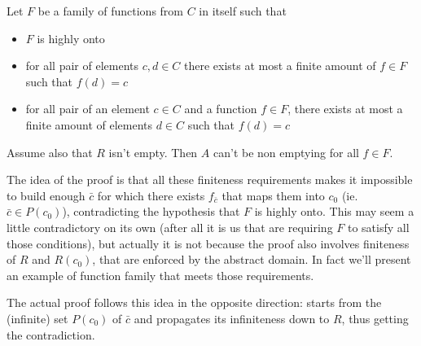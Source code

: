 \begin{theorem}\label{ch4:th:non-empt-res-global}
	Let $F$ be a family of functions from $C$ in itself such that
	\begin{itemize}
		\item $F$ is highly onto
		\item for all pair of elements $c, d \in C$ there exists at most a finite amount of $f \in F$ such that $f(d) = c$
		\item for all pair of an element $c \in C$ and a function $f \in F$, there exists at most a finite amount of elements $d \in C$ such that $f(d) = c$
	\end{itemize}
	Assume also that $R$ isn't empty. Then $A$ can't be non emptying for all $f \in F$.
\end{theorem}

The idea of the proof is that all these finiteness requirements makes it impossible to build enough $\bar{c}$ for which there exists $f_{\bar{c}}$ that maps them into $c_0$ (ie. $\bar{c} \in P(c_0)$), contradicting the hypothesis that $F$ is highly onto. This may seem a little contradictory on its own (after all it is us that are requiring $F$ to satisfy all those conditions), but actually it is not because the proof also involves finiteness of $R$ and $R(c_0)$, that are enforced by the abstract domain. In fact we'll present an example of function family that meets those requirements.

The actual proof follows this idea in the opposite direction: starts from the (infinite) set $P(c_0)$ of $\bar{c}$ and propagates its infiniteness down to $R$, thus getting the contradiction.

